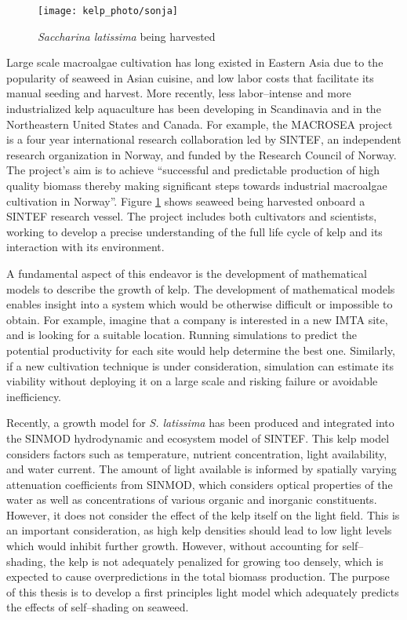 \begin{figure}[h]
  \centering
  \texttt{[image: kelp\_photo/sonja]}
  \caption{\textit{Saccharina latissima} being harvested}
  \label{fig:sonja}
\end{figure}

Large scale macroalgae cultivation has long existed in Eastern Asia due to the popularity of seaweed in Asian cuisine, and low labor costs that facilitate its manual seeding and harvest.
  More recently, less labor--intense and more industrialized kelp aquaculture has been developing in Scandinavia and in the Northeastern United States and Canada.
  For example, the MACROSEA project is a four year international research collaboration led by SINTEF, an independent research organization in Norway, and funded by the Research Council of Norway.
  The project's aim is to achieve ``successful and predictable production of high quality biomass thereby making significant steps towards industrial macroalgae cultivation in Norway''.
Figure \ref{fig:sonja} shows seaweed being harvested onboard a SINTEF research vessel.
The project includes both cultivators and scientists, working to develop a precise understanding of the full life cycle of kelp and its interaction with its environment.

A fundamental aspect of this endeavor is the development of mathematical models to describe the growth of kelp.
The development of mathematical models enables insight into a system which would be otherwise difficult or impossible to obtain.
For example, imagine that a company is interested in a new IMTA site, and is looking for a suitable location.
Running simulations to predict the potential productivity for each site would help determine the best one.
Similarly, if a new cultivation technique is under consideration, simulation can estimate its viability without
deploying it on a large scale and risking failure or avoidable inefficiency.

Recently, a growth model \cite{broch_modelling_2012} for \textit{S. latissima} has been produced and integrated into the SINMOD \cite{wassmann_modelling_2006} hydrodynamic and ecosystem model of SINTEF.
This kelp model considers factors such as temperature, nutrient concentration, light availability, and water current.
The amount of light available is informed by spatially varying attenuation coefficients from SINMOD,
which considers optical properties of the water as well as concentrations of various organic and inorganic constituents.
However, it does not consider the effect of the kelp itself on the light field.
This is an important consideration, as high kelp densities should lead to low light levels which would inhibit further growth.
However, without accounting for self--shading, the kelp is not adequately penalized for growing too densely,
which is expected to cause overpredictions in the total biomass production.
The purpose of this thesis is to develop a first principles light model which adequately predicts the effects of self--shading on seaweed.


